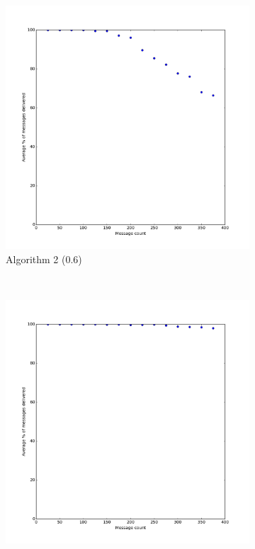 \documentclass[bsc,frontabs,twoside,singlespacing,parskip,deptreport]{infthesis}     %
\begin{document}
\begin{figure}
    \begin{subfigure}[b]{0.3\textwidth}
        \includegraphics[width=\textwidth]{results/BasicShare_Prob60}
        \caption{Algorithm 2 (0.6)}
        \label{fig:results/BasicShare_Prob60}
    \end{subfigure}
    ~ %
    \begin{subfigure}[b]{0.3\textwidth}
        \includegraphics[width=\textwidth]{results/BasicShare_OnlyBest}

\end{subfigure}
\end{figure}
\end{document}
